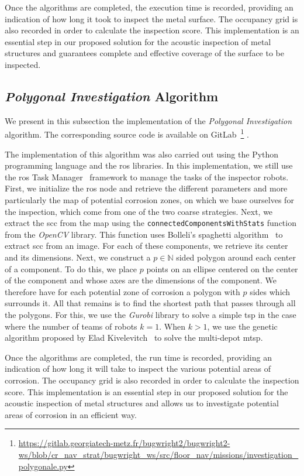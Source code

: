 Once the algorithms are completed, the execution time is recorded, providing an indication of how long it took to inspect the metal surface.
The occupancy grid is also recorded in order to calculate the inspection score.
This implementation is an essential step in our proposed solution for the acoustic inspection of metal structures and guarantees complete and effective coverage of the surface to be inspected.

\subsection*{\textit{Polygonal Investigation} Algorithm}

We present in this subsection the implementation of the \textit{Polygonal Investigation} algorithm.
The corresponding source code is available on GitLab~\footnote{\url{https://gitlab.georgiatech-metz.fr/bugwright2/bugwright2-ws/blob/cr_nav_strat/bugwright_ws/src/floor_nav/missions/investigation_polygonale.py}} .

The implementation of this algorithm was also carried out using the Python programming language and the \gls{ros} libraries.
In this implementation, we still use the \gls{ros} Task Manager~\cite{ROSTaskManager} framework to manage the tasks of the inspector robots.
First, we initialize the \gls{ros} node and retrieve the different parameters and more particularly the map of potential corrosion zones, on which we base ourselves for the inspection, which come from one of the two coarse strategies.
Next, we extract the \gls{scc} from the map using the \texttt{connectedComponentsWithStats} function from the \textit{OpenCV} library.
This function uses Bolleli's spaghetti algorithm~\cite{BolelliSpaghetti} to extract \gls{scc} from an image.
For each of these components, we retrieve its center and its dimensions.
Next, we construct a $p \in \mathbb{N}$ sided polygon around each center of a component.
To do this, we place $p$ points on an ellipse centered on the center of the component and whose axes are the dimensions of the component.
We therefore have for each potential zone of corrosion a polygon with $p$ sides which surrounds it.
All that remains is to find the shortest path that passes through all the polygons.
For this, we use the \textit{Gurobi} library to solve a simple \gls{tsp} in the case where the number of teams of robots $k = 1$.
When $k > 1$, we use the genetic algorithm proposed by Elad Kivelevitch~\cite{MDMTSPV_GA} to solve the multi-depot \gls{mtsp}.

Once the algorithms are completed, the run time is recorded, providing an indication of how long it will take to inspect the various potential areas of corrosion.
The occupancy grid is also recorded in order to calculate the inspection score.
This implementation is an essential step in our proposed solution for the acoustic inspection of metal structures and allows us to investigate potential areas of corrosion in an efficient way.

